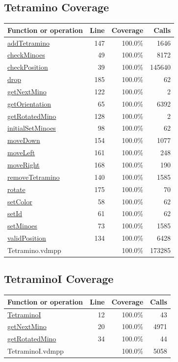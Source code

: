 \documentclass[a4paper]{article}
\begin{document}
\subsection{Tetramino Coverage}
\begin{longtable}{|l|r|r|r|}
\hline
Function or operation & Line & Coverage & Calls \\
\hline
\hline
\hyperref[addTetramino:147]{addTetramino} & 147&100.0\% & 1646 \\
\hline
\hyperref[checkMinoes:49]{checkMinoes} & 49&100.0\% & 8172 \\
\hline
\hyperref[checkPosition:39]{checkPosition} & 39&100.0\% & 145640 \\
\hline
\hyperref[drop:185]{drop} & 185&100.0\% & 62 \\
\hline
\hyperref[getNextMino:122]{getNextMino} & 122&100.0\% & 2 \\
\hline
\hyperref[getOrientation:65]{getOrientation} & 65&100.0\% & 6392 \\
\hline
\hyperref[getRotatedMino:128]{getRotatedMino} & 128&100.0\% & 2 \\
\hline
\hyperref[initialSetMinoes:98]{initialSetMinoes} & 98&100.0\% & 62 \\
\hline
\hyperref[moveDown:154]{moveDown} & 154&100.0\% & 1077 \\
\hline
\hyperref[moveLeft:161]{moveLeft} & 161&100.0\% & 248 \\
\hline
\hyperref[moveRight:168]{moveRight} & 168&100.0\% & 190 \\
\hline
\hyperref[removeTetramino:140]{removeTetramino} & 140&100.0\% & 1585 \\
\hline
\hyperref[rotate:175]{rotate} & 175&100.0\% & 70 \\
\hline
\hyperref[setColor:58]{setColor} & 58&100.0\% & 62 \\
\hline
\hyperref[setId:61]{setId} & 61&100.0\% & 62 \\
\hline
\hyperref[setMinoes:73]{setMinoes} & 73&100.0\% & 1585 \\
\hline
\hyperref[validPosition:134]{validPosition} & 134&100.0\% & 6428 \\
\hline
\hline
Tetramino.vdmpp & & 100.0\% & 173285 \\
\hline
\end{longtable}

\subsection{TetraminoI Coverage}
\begin{longtable}{|l|r|r|r|}
\hline
Function or operation & Line & Coverage & Calls \\
\hline
\hline
\hyperref[TetraminoI:12]{TetraminoI} & 12&100.0\% & 43 \\
\hline
\hyperref[getNextMino:20]{getNextMino} & 20&100.0\% & 4971 \\
\hline
\hyperref[getRotatedMino:34]{getRotatedMino} & 34&100.0\% & 44 \\
\hline
\hline
TetraminoI.vdmpp & & 100.0\% & 5058 \\
\hline
\end{longtable}
\end{document}
